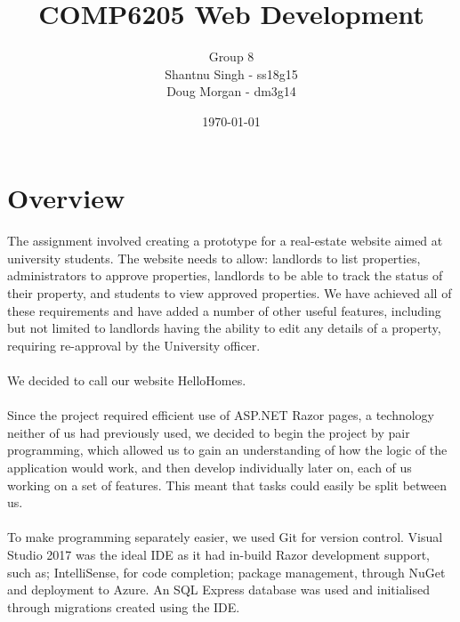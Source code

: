 \documentclass{article}
\begin{document}
\title{COMP6205 Web Development\\}
\author{Group 8\\Shantnu Singh - ss18g15\\Doug Morgan - dm3g14}
\date{\today}
\maketitle

\section{Overview}
    \paragraph{}
        The assignment involved creating a prototype for a real-estate website aimed at university students.
        The website needs to allow: landlords to list properties, administrators to approve properties, landlords to be able to track the status of their property, and students to view approved properties.
        We have achieved all of these requirements and have added a number of other useful features, including but not limited to landlords having the ability to edit any details of a property, requiring re-approval by the University officer.

    \paragraph{}
        We decided to call our website HelloHomes.

    \paragraph{}
        Since the project required efficient use of ASP.NET Razor pages, a technology neither of us had previously used, we decided to begin the project by pair programming, which allowed us to gain an understanding of how the logic of the application would work, and then develop individually later on, each of us working on a set of features.
        This meant that tasks could easily be split between us.

    \paragraph{}
        To make programming separately easier, we used Git for version control.
        Visual Studio 2017 was the ideal IDE as it had in-build Razor development support, such as; IntelliSense, for code completion; package management, through NuGet and deployment to Azure.
        An SQL Express database was used and initialised through migrations created using the IDE.
\end{document}
